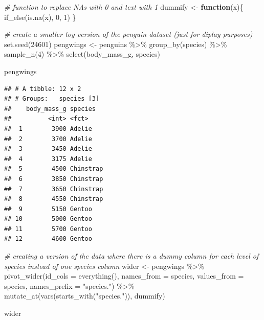 \documentclass[
]{book}
\newenvironment{Shaded}{\begin{snugshade}}{\end{snugshade}}
\newcommand{\AttributeTok}[1]{\textcolor[rgb]{0.77,0.63,0.00}{#1}}
\newcommand{\CommentTok}[1]{\textcolor[rgb]{0.56,0.35,0.01}{\textit{#1}}}
\newcommand{\ControlFlowTok}[1]{\textcolor[rgb]{0.13,0.29,0.53}{\textbf{#1}}}
\newcommand{\DecValTok}[1]{\textcolor[rgb]{0.00,0.00,0.81}{#1}}
\newcommand{\FunctionTok}[1]{\textcolor[rgb]{0.00,0.00,0.00}{#1}}
\newcommand{\NormalTok}[1]{#1}
\newcommand{\OtherTok}[1]{\textcolor[rgb]{0.56,0.35,0.01}{#1}}
\newcommand{\SpecialCharTok}[1]{\textcolor[rgb]{0.00,0.00,0.00}{#1}}
\newcommand{\StringTok}[1]{\textcolor[rgb]{0.31,0.60,0.02}{#1}}
\begin{document}
\begin{Shaded}
\begin{Highlighting}[]
\CommentTok{\# function to replace NAs with 0 and text with 1}
\NormalTok{dummify }\OtherTok{\textless{}{-}} \ControlFlowTok{function}\NormalTok{(x)\{}
  \FunctionTok{if\_else}\NormalTok{(}\FunctionTok{is.na}\NormalTok{(x), }\DecValTok{0}\NormalTok{, }\DecValTok{1}\NormalTok{)}
\NormalTok{\}}

\CommentTok{\# create a smaller toy version of the penguin dataset (just for diplay purposes)}
\FunctionTok{set.seed}\NormalTok{(}\DecValTok{24601}\NormalTok{)}
\NormalTok{pengwings }\OtherTok{\textless{}{-}}\NormalTok{ penguins }\SpecialCharTok{\%\textgreater{}\%} 
  \FunctionTok{group\_by}\NormalTok{(species) }\SpecialCharTok{\%\textgreater{}\%} 
  \FunctionTok{sample\_n}\NormalTok{(}\DecValTok{4}\NormalTok{) }\SpecialCharTok{\%\textgreater{}\%} 
  \FunctionTok{select}\NormalTok{(body\_mass\_g, species)}

\NormalTok{pengwings}
\end{Highlighting}
\end{Shaded}

\begin{verbatim}
## # A tibble: 12 x 2
## # Groups:   species [3]
##    body_mass_g species  
##          <int> <fct>    
##  1        3900 Adelie   
##  2        3700 Adelie   
##  3        3450 Adelie   
##  4        3175 Adelie   
##  5        4500 Chinstrap
##  6        3850 Chinstrap
##  7        3650 Chinstrap
##  8        4550 Chinstrap
##  9        5150 Gentoo   
## 10        5000 Gentoo   
## 11        5700 Gentoo   
## 12        4600 Gentoo
\end{verbatim}

\begin{Shaded}
\begin{Highlighting}[]
\CommentTok{\# creating a version of the data where there is a dummy column for each level of species instead of one species column}
\NormalTok{wider }\OtherTok{\textless{}{-}}\NormalTok{ pengwings }\SpecialCharTok{\%\textgreater{}\%} 
  \FunctionTok{pivot\_wider}\NormalTok{(}\AttributeTok{id\_cols =} \FunctionTok{everything}\NormalTok{(), }\AttributeTok{names\_from =}\NormalTok{ species, }\AttributeTok{values\_from =}\NormalTok{ species, }\AttributeTok{names\_prefix =} \StringTok{"species."}\NormalTok{) }\SpecialCharTok{\%\textgreater{}\%} 
  \FunctionTok{mutate\_at}\NormalTok{(}\FunctionTok{vars}\NormalTok{(}\FunctionTok{starts\_with}\NormalTok{(}\StringTok{"species."}\NormalTok{)), dummify)}

\NormalTok{wider}
\end{Highlighting}
\end{Shaded}
\end{document}
